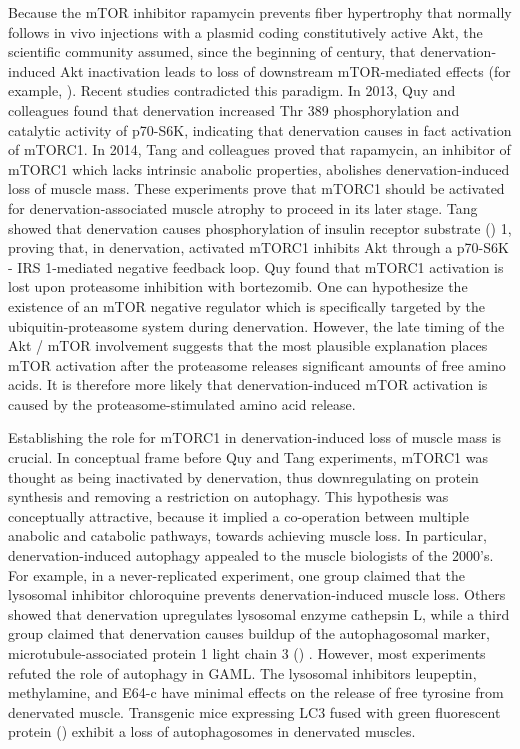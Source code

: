 \documentclass[12pt,english]{report}\usepackage[]{graphicx}\usepackage[]{color}
\begin{document}
Because the mTOR inhibitor rapamycin prevents fiber hypertrophy that
normally follows in vivo injections with a plasmid coding constitutively
active Akt\citep{bodine2001akt/mtor}, the scientific community assumed,
since the beginning of century, that denervation-induced Akt inactivation
leads to loss of downstream mTOR-mediated effects (for example, \citep{zhao2007foxo3,schiaffino2013mechanisms}).
Recent studies contradicted this paradigm. In 2013, Quy and colleagues
found that denervation increased Thr 389 phosphorylation and catalytic
activity of p70-S6K, indicating that denervation causes in fact activation
of mTORC1\citep{quy2013proteasome-dependent}. In 2014, Tang and colleagues
proved that rapamycin, an inhibitor of mTORC1 which lacks intrinsic
anabolic properties, abolishes denervation-induced loss of muscle
mass\citep{tang2014mtorc1}. These experiments prove that mTORC1 should
be activated for denervation-associated muscle atrophy to proceed
in its later stage. Tang showed that denervation causes phosphorylation
of insulin receptor substrate ()
1, proving that, in denervation, activated mTORC1 inhibits Akt through
a p70-S6K - IRS 1-mediated negative feedback loop. Quy found that
mTORC1 activation is lost upon proteasome inhibition with bortezomib.
One can hypothesize the existence of an mTOR negative regulator which
is specifically targeted by the ubiquitin-proteasome system during
denervation. However, the late timing of the Akt / mTOR involvement
suggests that the most plausible explanation places mTOR activation
after the proteasome releases significant amounts of free amino acids.
It is therefore more likely that denervation-induced mTOR activation
is caused by the proteasome-stimulated amino acid release.

Establishing the role for mTORC1 in denervation-induced loss of muscle
mass is crucial. In conceptual frame before Quy and Tang experiments,
mTORC1 was thought as being inactivated by denervation, thus downregulating
on protein synthesis and removing a restriction on autophagy. This
hypothesis was conceptually attractive, because it implied a co-operation
between multiple anabolic and catabolic pathways, towards achieving
muscle loss. In particular, denervation-induced autophagy appealed
to the muscle biologists of the 2000's. For example, in a never-replicated
experiment, one group claimed that the lysosomal inhibitor chloroquine
prevents denervation-induced muscle loss\citep{schwartz1990effects}.
Others showed that denervation upregulates lysosomal enzyme cathepsin
L\citep{mammucari2007foxo3}, while a third group claimed that denervation
causes buildup of the autophagosomal marker, microtubule-associated
protein 1 light chain 3 ()
\citep{ju2010quantitation}. However, most experiments refuted the
role of autophagy in GAML. The lysosomal inhibitors leupeptin, methylamine,
and E64-c have minimal effects on the release of free tyrosine from
denervated muscle\citep{furuno1990role}. Transgenic mice expressing
LC3 fused with green fluorescent protein ()
exhibit a loss of autophagosomes in denervated muscles\citep{quy2013proteasome-dependent}. 
\end{document}

